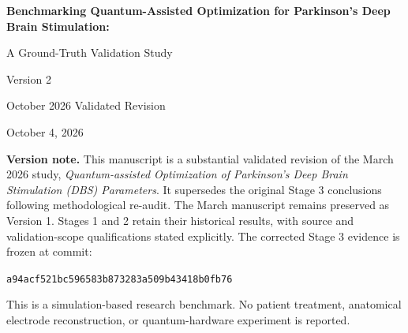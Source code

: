 \documentclass[11pt,letterpaper]{article}
\begin{document}
\begin{titlepage}
\centering
\vspace*{1.1in}
{\LARGE\bfseries Benchmarking Quantum-Assisted Optimization for Parkinson's Deep Brain Stimulation:\par A Ground-Truth Validation Study\par}
\vspace{0.7in}
{\Large Version 2\par}
\vspace{0.15in}
{\large October 2026 Validated Revision\par}
{\large October 4, 2026\par}
\vfill
\begin{minipage}{0.88\textwidth}
\textbf{Version note.} This manuscript is a substantial validated revision of the March 2026 study, \emph{Quantum-assisted Optimization of Parkinson's Deep Brain Stimulation (DBS) Parameters}. It supersedes the original Stage 3 conclusions following methodological re-audit. The March manuscript remains preserved as Version 1. Stages 1 and 2 retain their historical results, with source and validation-scope qualifications stated explicitly. The corrected Stage 3 evidence is frozen at commit:\par
\smallskip
\small\nolinkurl{a94acf521bc596583b873283a509b43418b0fb76}\par
\normalsize\smallskip
This is a simulation-based research benchmark. No patient treatment, anatomical electrode reconstruction, or quantum-hardware experiment is reported.
\end{minipage}
\vspace{0.5in}
\end{titlepage}
\end{document}
